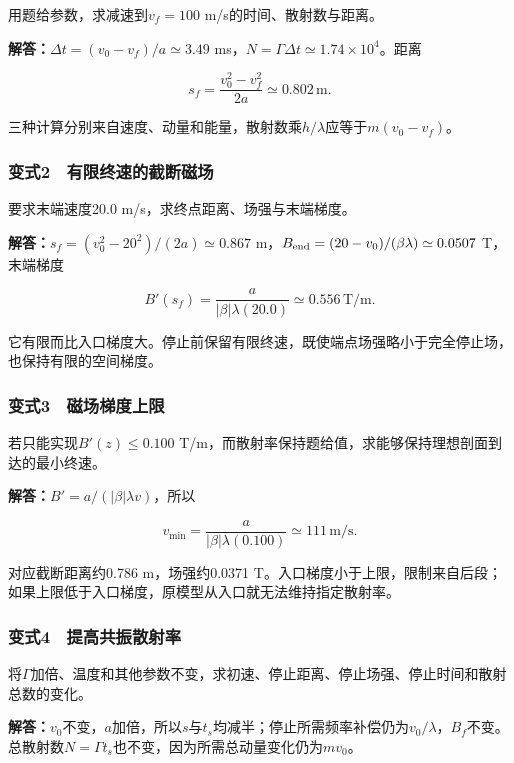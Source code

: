 \documentclass[12pt,a4paper,fontset=fandol]{ctexart}
\begin{document}
用题给参数，求减速到\(v_f=100\) m/s的时间、散射数与距离。

\textbf{解答：}\(\Delta t=(v_0-v_f)/a\simeq3.49\)
ms，\(N=\Gamma\Delta t\simeq1.74\times10^4\)。距离

\[
s_f=\frac{v_0^2-v_f^2}{2a}\simeq0.802\,\mathrm m.
\]

三种计算分别来自速度、动量和能量，散射数乘\(h/\lambda\)应等于\(m(v_0-v_f)\)。

\subsubsection{变式2　有限终速的截断磁场}\label{ux53d8ux5f0f2-ux6709ux9650ux7ec8ux901fux7684ux622aux65adux78c1ux573a}

要求末端速度20.0 m/s，求终点距离、场强与末端梯度。

\textbf{解答：}\(s_f=(v_0^2-20^2)/(2a)\simeq0.867\)
m，\(B_{\rm end}=(20-v_0)/(\beta\lambda)\simeq0.0507\) T，末端梯度

\[
B'(s_f)=\frac{a}{|\beta|\lambda(20.0)}
\simeq0.556\,\mathrm{T/m}.
\]

它有限而比入口梯度大。停止前保留有限终速，既使端点场强略小于完全停止场，也保持有限的空间梯度。

\subsubsection{变式3　磁场梯度上限}\label{ux53d8ux5f0f3-ux78c1ux573aux68afux5ea6ux4e0aux9650}

若只能实现\(B'(z)\leq0.100\)
T/m，而散射率保持题给值，求能够保持理想剖面到达的最小终速。

\textbf{解答：}\(B'=a/(|\beta|\lambda v)\)，所以

\[
v_{\min}=\frac{a}{|\beta|\lambda(0.100)}
\simeq111\,\mathrm{m/s}.
\]

对应截断距离约0.786 m，场强约0.0371
T。入口梯度小于上限，限制来自后段；如果上限低于入口梯度，原模型从入口就无法维持指定散射率。

\subsubsection{变式4　提高共振散射率}\label{ux53d8ux5f0f4-ux63d0ux9ad8ux5171ux632fux6563ux5c04ux7387}

将\(\Gamma\)加倍、温度和其他参数不变，求初速、停止距离、停止场强、停止时间和散射总数的变化。

\textbf{解答：}\(v_0\)不变，\(a\)加倍，所以\(s\)与\(t_s\)均减半；停止所需频率补偿仍为\(v_0/\lambda\)，\(B_f\)不变。总散射数\(N=\Gamma t_s\)也不变，因为所需总动量变化仍为\(mv_0\)。
\end{document}

